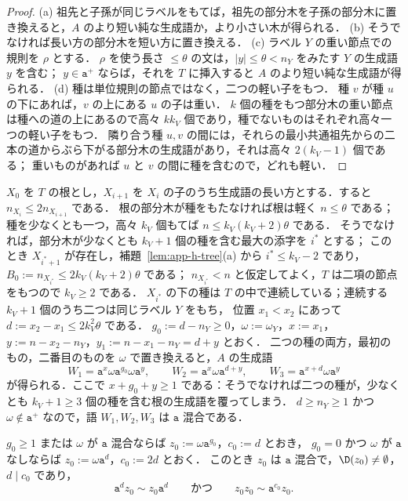 \begin{proof}
(a) 祖先と子孫が同じラベルをもてば，祖先の部分木を子孫の部分木に置き換えると，$A$ のより短い純な生成語か，より小さい木が得られる．
(b) そうでなければ長い方の部分木を短い方に置き換える．
(c) ラベル $Y$ の重い節点での規則を $\rho$ とする．
$\rho$ を使う長さ $\le\theta$ の文は，$|y|\le\theta<n_Y$ をみたす $Y$ の生成語 $y$ を含む；
$y\in\mathtt a^+$ ならば，それを $T$ に挿入すると $A$ のより短い純な生成語が得られる．
(d) 種は単位規則の節点ではなく，二つの軽い子をもつ．
種 $v$ が種 $u$ の下にあれば，$v$ の上にある $u$ の子は重い．
$k$ 個の種をもつ部分木の重い節点は種への道の上にあるので高々 $kk_V$ 個であり，種でないものはそれぞれ高々一つの軽い子をもつ．
隣り合う種 $u,v$ の間には，それらの最小共通祖先からの二本の道からぶら下がる部分木の生成語があり，それは高々 $2(k_V-1)$ 個である；
重いものがあれば $u$ と $v$ の間に種を含むので，どれも軽い．
\end{proof}

$X_0$ を $T$ の根とし，$X_{i+1}$ を $X_i$ の子のうち生成語の長い方とする．すると $n_{X_i}\le2n_{X_{i+1}}$ である．
根の部分木が種をもたなければ根は軽く $n\le\theta$ である；種を少なくとも一つ，高々 $k_V$ 個もてば $n\le k_V(k_V+2)\theta$ である．
そうでなければ，部分木が少なくとも $k_V+1$ 個の種を含む最大の添字を $i^*$ とする；
このとき $X_{i^*+1}$ が存在し，補題~\ref{lem:app-h-tree}(a) から $i^*\le k_V-2$ であり，$B_0:=n_{X_{i^*}}\le2k_V(k_V+2)\theta$ である；
$n_{X_{i^*}}<n$ と仮定してよく，$T$ は二項の節点をもつので $k_V\ge2$ である．
$X_{i^*}$ の下の種は $T$ の中で連続している；連続する $k_V+1$ 個のうち二つは同じラベル $Y$ をもち，
位置 $x_1<x_2$ にあって $d:=x_2-x_1\le2k_V^2\theta$ である．
$g_0:=d-n_Y\ge0$，$\omega:=\omega_Y$，$x:=x_1$，$y:=n-x_2-n_Y$，$y_1:=n-x_1-n_Y=d+y$ とおく．
二つの種の両方，最初のもの，二番目のものを $\omega$ で置き換えると，$A$ の生成語
\[
 W_1=\mathtt a^x\omega\mathtt a^{g_0}\omega\mathtt a^y,\qquad
 W_2=\mathtt a^x\omega\mathtt a^{d+y},\qquad
 W_3=\mathtt a^{x+d}\omega\mathtt a^y
\]
が得られる．ここで $x+g_0+y\ge1$ である：そうでなければ二つの種が，少なくとも $k_V+1\ge3$ 個の種を含む根の生成語を覆ってしまう．
$d\ge n_Y\ge1$ かつ $\omega\notin\mathtt a^+$ なので，語 $W_1,W_2,W_3$ は $\mathtt a$ 混合である．

\begin{lemma}[基底]
\label{lem:app-h-base}
$g_0\ge1$ または $\omega$ が $\mathtt a$ 混合ならば $z_0:=\omega\mathtt a^{g_0}$，$c_0:=d$ とおき，
$g_0=0$ かつ $\omega$ が $\mathtt a$ なしならば $z_0:=\omega\mathtt a^d$，$c_0:=2d$ とおく．
このとき $z_0$ は $\mathtt a$ 混合で，$\D(z_0)\ne\emptyset$，$d\mid c_0$ であり，
\[
 \mathtt a^dz_0\sim z_0\mathtt a^d\qquad\text{かつ}\qquad z_0z_0\sim\mathtt a^{c_0}z_0.
\]
\end{lemma}

